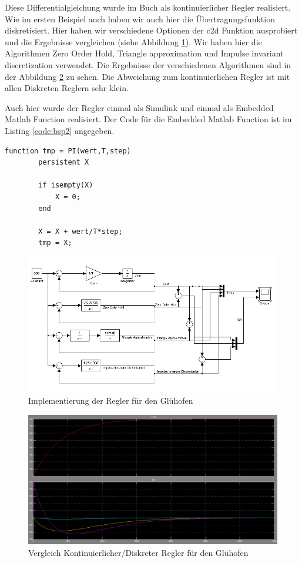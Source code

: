\documentclass[a4paper]{article}
\begin{document}
Diese Differentialgleichung wurde im Buch als kontinuierlicher Regler realisiert. Wie im ersten Beispiel auch haben wir auch hier die Übertragungsfunktion diskretisiert. Hier haben wir verschiedene Optionen der c2d Funktion ausprobiert und die Ergebnisse vergleichen (siehe Abbildung \ref{fig:reg_bsp2}). Wir haben hier die Algorithmen Zero Order Hold, Triangle approximation und Impulse invariant discretization verwendet. Die Ergebnisse der verschiedenen Algorithmen sind in der Abbildung \ref{fig:bsp2} zu sehen. Die Abweichung zum kontinuierlichen Regler ist mit allen Diskreten Reglern sehr klein.

Auch hier wurde der Regler einmal als Simulink und einmal als Embedded Matlab Function realisiert. Der Code für die Embedded Matlab Function ist im Listing \ref{code:bsp2} angegeben.

\begin{lstlisting}[caption={Code für Matlab Function für Glühofen},label=code:bsp2]
    function tmp = PI(wert,T,step)
        persistent X

        if isempty(X)
            X = 0;
        end

        X = X + wert/T*step;
        tmp = X;
\end{lstlisting}

\begin{figure}[H]
    \centering
    \includegraphics[width=\linewidth]{regler_bsp2.png}
    \caption{Implementierung der Regler für den Glühofen}
    \label{fig:reg_bsp2}
\end{figure}

\begin{figure}[H]
    \centering
    \includegraphics[width=\linewidth]{erg_bsp2.png}
    \caption{Vergleich Kontinuierlicher/Diskreter Regler für den Glühofen}
    \label{fig:bsp2}
\end{figure}
\end{document}
